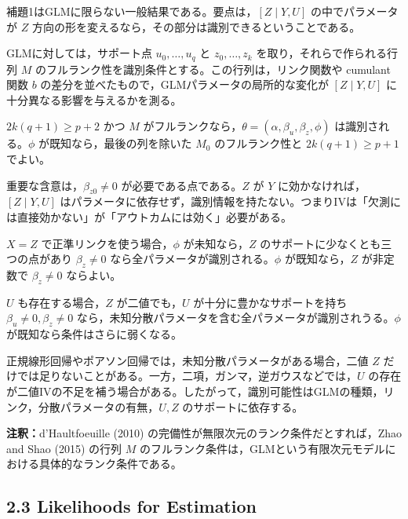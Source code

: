 \documentclass[dvipdfmx,autodetect-engine]{jsarticle}
\newcommand{\note}[1]{\par\smallskip\noindent\textbf{注釈：}#1\par\smallskip}
\begin{document}
補題1はGLMに限らない一般結果である。要点は，$[Z\mid Y,U]$ の中でパラメータが $Z$ 方向の形を変えるなら，その部分は識別できるということである。

GLMに対しては，サポート点 $u_0,\ldots,u_q$ と $z_0,\ldots,z_k$ を取り，それらで作られる行列 $M$ のフルランク性を識別条件とする。この行列は，リンク関数や cumulant 関数 $b$ の差分を並べたもので，GLMパラメータの局所的な変化が $[Z\mid Y,U]$ に十分異なる影響を与えるかを測る。

\begin{description}[leftmargin=3.2em]
\item[Theorem 1] $2k(q+1)\ge p+2$ かつ $M$ がフルランクなら，$\theta=(\alpha,\beta_u,\beta_z,\phi)$ は識別される。$\phi$ が既知なら，最後の列を除いた $M_0$ のフルランク性と $2k(q+1)\ge p+1$ でよい。
\end{description}

重要な含意は，$\beta_{z0}\neq0$ が必要である点である。$Z$ が $Y$ に効かなければ，$[Z\mid Y,U]$ はパラメータに依存せず，識別情報を持たない。つまりIVは「欠測には直接効かない」が「アウトカムには効く」必要がある。

\begin{description}[leftmargin=3.2em]
\item[Corollary 1] $X=Z$ で正準リンクを使う場合，$\phi$ が未知なら，$Z$ のサポートに少なくとも三つの点があり $\beta_z\neq0$ なら全パラメータが識別される。$\phi$ が既知なら，$Z$ が非定数で $\beta_z\neq0$ ならよい。
\item[Corollary 2] $U$ も存在する場合，$Z$ が二値でも，$U$ が十分に豊かなサポートを持ち $\beta_u\neq0,\beta_z\neq0$ なら，未知分散パラメータを含む全パラメータが識別されうる。$\phi$ が既知なら条件はさらに弱くなる。
\end{description}

正規線形回帰やポアソン回帰では，未知分散パラメータがある場合，二値 $Z$ だけでは足りないことがある。一方，二項，ガンマ，逆ガウスなどでは，$U$ の存在が二値IVの不足を補う場合がある。したがって，識別可能性はGLMの種類，リンク，分散パラメータの有無，$U,Z$ のサポートに依存する。

\note{d'Haultfoeuille (2010) の完備性が無限次元のランク条件だとすれば，Zhao and Shao (2015) の行列 $M$ のフルランク条件は，GLMという有限次元モデルにおける具体的なランク条件である。}

\subsection{2.3 Likelihoods for Estimation}
\end{document}
